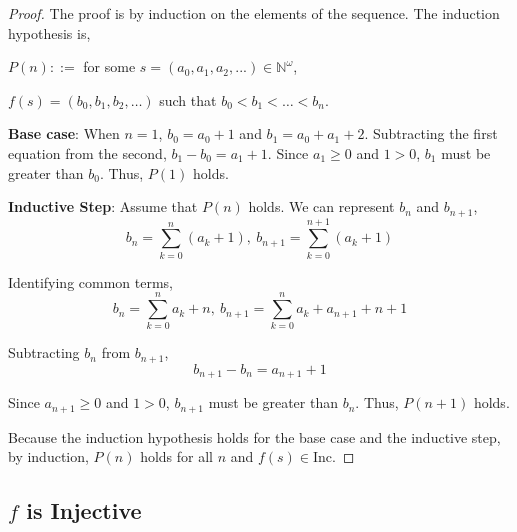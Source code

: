 \documentclass{article}
\begin{document}
\begin{proof}

  The proof is by induction on the elements of the sequence. The induction
  hypothesis is,
  \begin{center}
    $ P(n) ::= $ for some $s = (a_{0}, a_{1}, a_{2}, ...) \in \mathbb{N}^{\omega}$,

    $f(s) = (b_{0}, b_{1}, b_{2}, \ldots)$ such that $b_{0} < b_{1} < \ldots < b_{n}$.
  \end{center}

  \textbf{Base case}: When $n = 1$, $b_{0} = a_{0} + 1$ and $b_{1} =
  a_{0} + a_{1} + 2$. Subtracting the first equation from the second, $b_{1} -
  b_{0} = a_{1} + 1$. Since $a_{1} \geq 0$ and $1 > 0$, $b_{1}$ must be greater
  than $b_{0}$. Thus, $P(1)$ holds.

  \bigbreak

  \textbf{Inductive Step}: Assume that $P(n)$ holds. We can represent $b_{n}$
  and $b_{n+1}$,
  $$ b_{n} = \sum\limits_{k=0}^{n} (a_{k} + 1),\ b_{n+1} =
  \sum\limits_{k=0}^{n+1} (a_{k} + 1) $$

  Identifying common terms,
  $$ b_{n} = \sum\limits_{k=0}^{n} a_{k} + n,\ b_{n+1} = \sum\limits_{k=0}^{n}
  a_{k} + a_{n+1} + n + 1 $$

  Subtracting $b_{n}$ from $b_{n+1}$,
  $$ b_{n+1} - b_{n} = a_{n+1} + 1 $$

  Since $a_{n+1} \geq 0$ and $1 > 0$, $b_{n+1}$ must be greater than $b_{n}$.
  Thus, $P(n+1)$ holds.

  \bigbreak

  Because the induction hypothesis holds for the base case and the inductive
  step, by induction, $P(n)$ holds for all $n$ and $f(s) \in \mathrm{Inc}$.

\end{proof}

\subsection*{$f$ is Injective}
\end{document}
